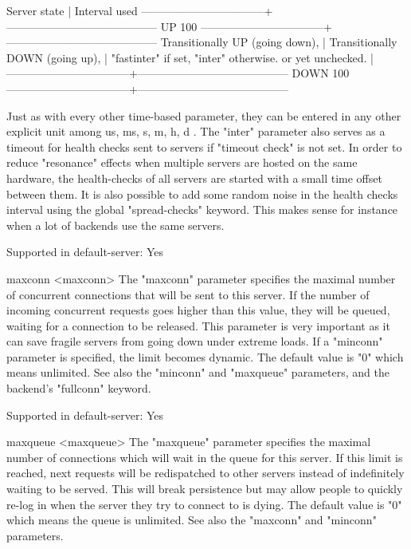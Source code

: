              Server state            |             Interval used
    ---------------------------------+-----------------------------------------
     UP 100%
    ---------------------------------+-----------------------------------------
     Transitionally UP (going down), |
     Transitionally DOWN (going up), | "fastinter" if set, "inter" otherwise.
     or yet unchecked.               |
    ---------------------------------+-----------------------------------------
     DOWN 100%
    ---------------------------------+-----------------------------------------

  Just as with every other time-based parameter, they can be entered in any
  other explicit unit among { us, ms, s, m, h, d }. The "inter" parameter also
  serves as a timeout for health checks sent to servers if "timeout check" is
  not set. In order to reduce "resonance" effects when multiple servers are
  hosted on the same hardware, the health-checks of all servers are started
  with a small time offset between them. It is also possible to add some random
  noise in the health checks interval using the global "spread-checks"
  keyword. This makes sense for instance when a lot of backends use the same
  servers.

  Supported in default-server: Yes

maxconn <maxconn>
  The "maxconn" parameter specifies the maximal number of concurrent
  connections that will be sent to this server. If the number of incoming
  concurrent requests goes higher than this value, they will be queued, waiting
  for a connection to be released. This parameter is very important as it can
  save fragile servers from going down under extreme loads. If a "minconn"
  parameter is specified, the limit becomes dynamic. The default value is "0"
  which means unlimited. See also the "minconn" and "maxqueue" parameters, and
  the backend's "fullconn" keyword.

  Supported in default-server: Yes

maxqueue <maxqueue>
  The "maxqueue" parameter specifies the maximal number of connections which
  will wait in the queue for this server. If this limit is reached, next
  requests will be redispatched to other servers instead of indefinitely
  waiting to be served. This will break persistence but may allow people to
  quickly re-log in when the server they try to connect to is dying. The
  default value is "0" which means the queue is unlimited. See also the
  "maxconn" and "minconn" parameters.

